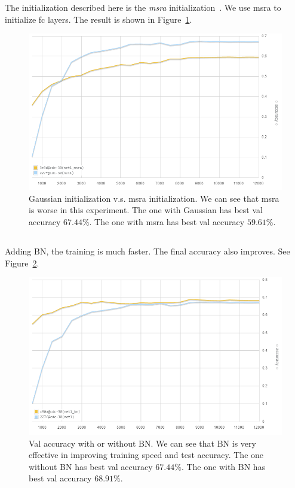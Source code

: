 The initialization described here is the \emph{msra} initialization~\cite{he2015delving}.
We use msra to initialize fc layers.
The result is shown in Figure~\ref{fig:msra}.

\begin{figure}[ht]
\centering
    \includegraphics[width=0.9\linewidth]{fig/msra}
    \caption{\small
    Gaussian initialization v.s. msra initialization.
    We can see that msra is worse in this experiment.
    The one with Gaussian has best val accuracy $67.44\%$.
    The one with msra has best val accuracy $59.61\%$.}
    \label{fig:msra}
\end{figure}

\subsection{} %

Adding BN,
the training is much faster.
The final accuracy also improves.
See Figure~\ref{fig:bn}.

\begin{figure}[ht]
\centering
    \includegraphics[width=0.9\linewidth]{fig/bn}
    \caption{\small
    Val accuracy with or without BN.
    We can see that BN is very effective in improving
    training speed and test accuracy.
    The one without BN has best val accuracy $67.44\%$.
    The one with BN has best val accuracy $68.91\%$.}
    \label{fig:bn}
\end{figure}

